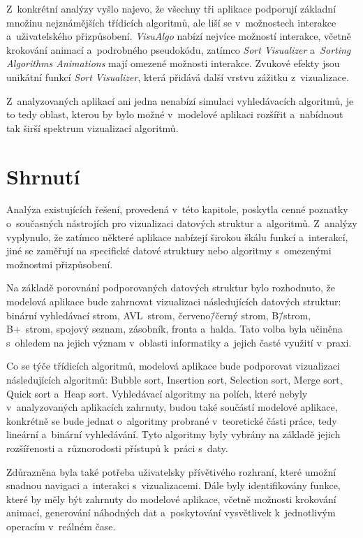 Z~konkrétní analýzy vyšlo najevo, že všechny tři aplikace podporují základní množinu nejznámějších třídicích algoritmů, ale liší se v~možnostech interakce a~uživatelského přizpůsobení.
\textit{VisuAlgo} nabízí nejvíce možností interakce, včetně krokování animací a~podrobného pseudokódu, zatímco \textit{Sort Visualizer} a~\textit{Sorting Algorithms Animations} mají omezené možnosti interakce.
Zvukové efekty jsou unikátní funkcí \textit{Sort Visualizer}, která přidává další vrstvu zážitku z~vizualizace.

Z~analyzovaných aplikací ani jedna nenabízí simulaci vyhledávacích algoritmů, je to tedy oblast, kterou by bylo možné v~modelové aplikaci rozšířit a~nabídnout tak širší spektrum vizualizací algoritmů.

\section{Shrnutí}
\label{sec:other_apps_summary}

Analýza existujících řešení, provedená v~této kapitole, poskytla cenné poznatky o~současných nástrojích pro vizualizaci datových struktur a~algoritmů.
Z~analýzy vyplynulo, že zatímco některé aplikace nabízejí širokou škálu funkcí a~interakcí, jiné se zaměřují na specifické datové struktury nebo algoritmy s~omezenými možnostmi přizpůsobení.

Na základě porovnání podporovaných datových struktur bylo rozhodnuto, že modelová aplikace bude zahrnovat vizualizaci následujících datových struktur: binární vyhledávací strom, AVL~strom, červeno\=/černý strom, B\=/strom, B+~strom, spojový seznam, zásobník, fronta a~halda.
Tato volba byla učiněna s~ohledem na jejich význam v~oblasti informatiky a~jejich časté využití v~praxi.

Co se týče třídicích algoritmů, modelová aplikace bude podporovat vizualizaci následujících algoritmů: Bubble sort, Insertion sort, Selection sort, Merge sort, Quick sort a~Heap sort.
Vyhledávací algoritmy na polích, které nebyly v~analyzovaných aplikacích zahrnuty, budou také součástí modelové aplikace, konkrétně se bude jednat o~algoritmy probrané v~teoretické části práce, tedy lineární a~binární vyhledávání.
Tyto algoritmy byly vybrány na základě jejich rozšířenosti a~různorodosti přístupů k~práci s~daty.

Zdůrazněna byla také potřeba uživatelsky přívětivého rozhraní, které umožní snadnou navigaci a~interakci s~vizualizacemi.
Dále byly identifikovány funkce, které by měly být zahrnuty do modelové aplikace, včetně možnosti krokování animací, generování náhodných dat a~poskytování vysvětlivek k~jednotlivým operacím v~reálném čase.
